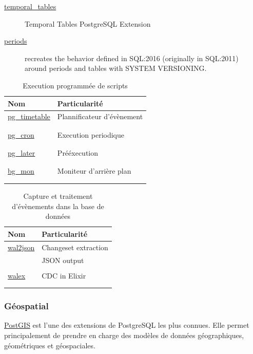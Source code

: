\documentclass[a4paper,12pt]{article}
\begin{document}
\begin{multicols*}{2}
\begin{description}
\item[{\href{https://github.com/arkhipov/temporal\_tables}{temporal\_tables}}] Temporal Tables PostgreSQL Extension
\item[{\href{https://github.com/xocolatl/periods}{periods}}] recreates the behavior defined in SQL:2016 (originally in SQL:2011) around periods and tables with SYSTEM VERSIONING.
\end{description}

\begin{table}[H]
\caption{Execution programmée de scripts}
\centering
\begin{tabular}{ll}
Nom & Particularité\\
\hline
\href{https://github.com/cybertec-postgresql/pg\_timetable}{pg\_timetable} & Plannificateur d'évènement\\
 & \\
 & \\
\href{https://github.com/citusdata/pg\_cron}{pg\_cron} & Execution periodique\\
 & \\
 & \\
\href{https://github.com/tembo-io/pg\_later}{pg\_later} & Prééxecution\\
 & \\
 & \\
\href{https://github.com/CyberDem0n/bg\_mon}{bg\_mon} & Moniteur d'arrière plan\\
 & \\
 & \\
\end{tabular}
\end{table}

\begin{table}[H]
\caption{Capture et traitement d'évènements dans la base de données}
\centering
\begin{tabular}{ll}
Nom & Particularité\\
\hline
\href{https://github.com/eulerto/wal2json}{wal2json} & Changeset extraction\\
 & JSON output\\
 & \\
\href{https://github.com/cpursley/walex}{walex} & CDC in Elixir\\
 & \\
 & \\
\end{tabular}
\end{table}
\subsubsection*{Géospatial}
\label{sec:org9752d82}
\href{https://github.com/postgis/postgis}{PostGIS} est l'une des extensions de PostgreSQL les plus connues. Elle permet principalement de prendre en charge des modèles de données géographiques, géométriques et géospaciales.


\end{multicols*}
\end{document}

